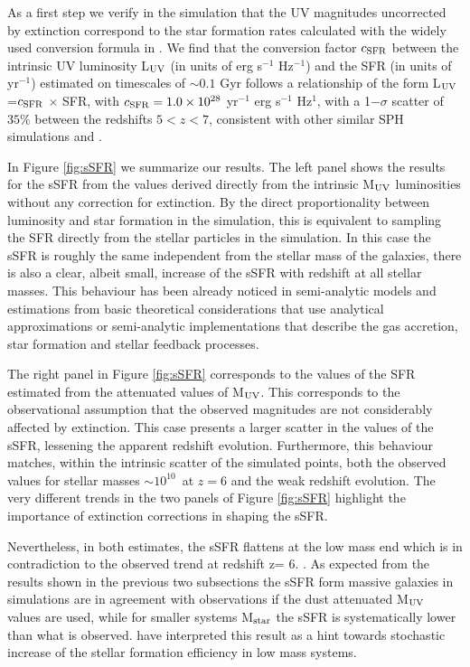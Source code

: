 \documentclass{emulateapj}
\newcommand{\Msun}{{\ifmmode{{\rm {M_{\odot}}}}\else{${\rm{M_{\odot}}}$}\fi}}
\begin{document}
As a first step we verify in the simulation that the UV magnitudes uncorrected by extinction correspond to the star formation rates calculated with the widely used conversion formula in \citet{1998ApJ...498..106M}. We find that the conversion factor $c_{\rm SFR}$ between the intrinsic UV luminosity L$_{\rm UV}$ (in units of erg s$^{-1}$ Hz$^{-1}$) and the SFR (in units of \Msun yr$^{-1}$) estimated on
timescales of $\sim 0.1$ Gyr follows a relationship of the form 
L$_{\rm UV}$=$c_{\rm SFR}$ $\times$ SFR, with $c_{\rm SFR} = 1.0\times
10^{28}$ \Msun yr$^{-1}$ erg s$^{-1}$ Hz$^1$, with a 1$-\sigma$ scatter of $35\%$ between the redshifts $5<z<7$, consistent with other similar SPH simulations
\citep{2011MNRAS.410.1703F} and \citet{1998ApJ...498..106M}. 




In Figure \ref{fig:sSFR} we summarize our results. The left panel
shows the results for the sSFR from the values derived directly from
the intrinsic M$_{\rm UV}$ luminosities without any correction for
extinction. By the direct proportionality between luminosity and star formation in the simulation, this is equivalent to sampling the SFR directly from the stellar particles in the simulation. In this case the sSFR is roughly the same independent from the stellar mass of the galaxies, there is also a clear, albeit small, increase of the sSFR with redshift at all stellar
masses. This behaviour has been already noticed in semi-analytic
models \citep{2011MNRAS.417.2737W} and estimations from basic
theoretical considerations that use analytical approximations
\citep{2010ApJ...718.1001B} or semi-analytic implementations
\citep{2011MNRAS.410L..42K} that describe the gas accretion, star
formation and stellar feedback processes. 


The right panel in Figure \ref{fig:sSFR} corresponds to the values of
the SFR estimated from the attenuated values of M$_{\rm UV}$.  This corresponds to the observational assumption that the observed magnitudes are not considerably affected by extinction. This case presents a larger scatter in the values of the sSFR, lessening the
apparent redshift evolution. Furthermore, this behaviour matches, within the
intrinsic scatter of the simulated points, both the observed values
for stellar masses $\sim 10^{10}$\Msun\ at $z=6$ and the weak redshift
evolution.  The very different trends in the two panels of Figure \ref{fig:sSFR} highlight the importance of extinction corrections in shaping the sSFR. 

Nevertheless, in both estimates, the sSFR flattens at the low mass end which
is in contradiction to the observed trend at redshift z= 6.
\citep{2009ApJ...697.1493S}. As expected from the results shown in
the previous two subsections the sSFR form massive galaxies in
simulations are in agreement with observations if the dust attenuated
M$_{\rm UV}$ values are used, while for smaller systems M$_{\rm star}$
the sSFR is  systematically lower than what is
observed. \cite{2011MNRAS.410L..42K} have interpreted this result as a
hint towards stochastic increase of the stellar formation efficiency
in low mass systems. 
\end{document}
